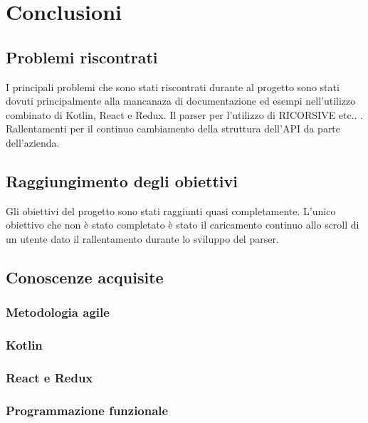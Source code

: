 
\chapter{Conclusioni}
\label{cap:conclusioni}

\section{Problemi riscontrati}
I principali problemi che sono stati riscontrati durante al progetto sono stati dovuti principalmente alla mancanaza di documentazione ed esempi nell'utilizzo combinato di Kotlin, React e Redux. Il parser per l'utilizzo di RICORSIVE etc.. . Rallentamenti per il continuo cambiamento della struttura dell'API da parte dell'azienda.

\section{Raggiungimento degli obiettivi}
Gli obiettivi del progetto sono stati raggiunti quasi completamente. L'unico obiettivo che non è stato completato è stato il caricamento continuo allo scroll di un utente dato il rallentamento durante lo sviluppo del parser.

\section{Conoscenze acquisite}
\subsection{Metodologia agile}
\subsection{Kotlin}
\subsection{React e Redux}
\subsection{Programmazione funzionale}
